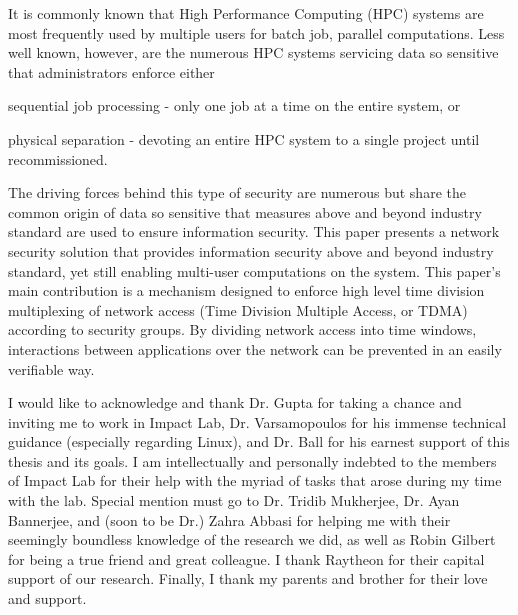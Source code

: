 \documentclass[oneside,12pt]{memoir}
\begin{document}
\pagestyle{plain}  %
\frontmatter
\thetitlepage

\setcounter{page}{1}
\asuabstract 
It is commonly known that High Performance Computing (HPC) systems are most frequently used by multiple users for batch job, parallel computations. Less well known, however, are the numerous HPC systems servicing data so sensitive that administrators enforce either \begin{inparaenum} 
\item sequential job processing - only one job at a time on the entire system, or
\item physical separation - devoting an entire HPC system to a single project until recommissioned.
\end{inparaenum}
The driving forces behind this type of security are numerous but share the common origin of data so sensitive that measures above and beyond industry standard are used to ensure information security. This paper presents a network security solution that provides information security above and beyond industry standard, yet still enabling multi-user computations on the system. This paper's main contribution is a mechanism designed to enforce high level time division multiplexing of network access (Time Division Multiple Access, or TDMA) according to security groups. By dividing network access into time windows, interactions between applications over the network can be prevented in an easily verifiable way. 

\asuacknowledgements
{I would like to acknowledge and thank Dr. Gupta for taking a chance and inviting me to work in Impact Lab, Dr. Varsamopoulos for his immense technical guidance (especially regarding Linux), and Dr. Ball for his earnest support of this thesis and its goals. I am intellectually and personally indebted to the members of Impact Lab for their help with the myriad of tasks that arose during my time with the lab. Special mention must go to Dr. Tridib Mukherjee, Dr. Ayan Bannerjee, and (soon to be Dr.) Zahra Abbasi for helping me with their seemingly boundless knowledge of the research we did, as well as Robin Gilbert for being a true friend and great colleague. I thank Raytheon for their capital support of our research. Finally, I thank my parents and brother for their love and support.
}

	\newpage
\vspace*{\fill}
\begingroup
\hspace*{\fill}
\hspace*{\fill}
\endgroup
\vspace*{\fill}
\end{document}
